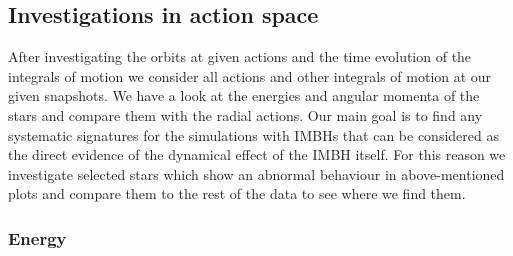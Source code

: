 \subsection{Investigations in action space}
After investigating the orbits at given actions and the time evolution of the integrals of motion we consider all actions and other integrals of motion at our given snapshots. We have a look at the energies and angular momenta of the stars and compare them with the radial actions. Our main goal is to find any systematic signatures for the simulations with \acp{IMBH} that can be considered as the direct evidence of the dynamical effect of the \ac{IMBH} itself. For this reason we investigate selected stars which show an abnormal behaviour in above-mentioned plots and compare them to the rest of the data to see where we find them.
\subsubsection{Energy}
